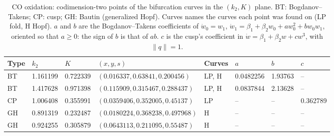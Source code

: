 \begin{table}
\centering
\caption{CO oxidation: codimension-two points of the bifurcation curves in the $(k_{2}, K)$ plane. BT: Bogdanov--Takens; CP: cusp; GH: Bautin (generalized Hopf). Curves names the curves each point was found on (LP fold, H Hopf). $a$ and $b$ are the Bogdanov--Takens coefficients of $\dot w_0 = w_1$, $\dot w_1 = \beta_1 + \beta_2 w_0 + a w_0^2 + b w_0 w_1$, oriented so that $a \ge 0$: the sign of $b$ is that of $ab$. $c$ is the cusp's coefficient in $\dot w = \beta_1 + \beta_2 w + c w^3$, with $\lVert q \rVert = 1$.}
\label{tab:co-oxidation-plane-points}
\begin{tabular}{@{}llllllll@{}}
\toprule
Type & $k_{2}$ & $K$ & $(x, y, s)$ & Curves & $a$ & $b$ & $c$ \\
\midrule
BT & \num{1.161199} & \num{0.722339} & $(\num{0.016337}, \num{0.63841}, \num{0.200456})$ & LP, H & \num{0.0482256} & \num{1.93763} & -- \\
BT & \num{1.417628} & \num{0.971398} & $(\num{0.115909}, \num{0.315467}, \num{0.288437})$ & LP, H & \num{0.0837844} & \num{2.13628} & -- \\
CP & \num{1.006408} & \num{0.355991} & $(\num{0.0359406}, \num{0.352005}, \num{0.45137})$ & LP & -- & -- & \num{0.362789} \\
GH & \num{0.891319} & \num{0.232487} & $(\num{0.0180224}, \num{0.368238}, \num{0.497968})$ & H & -- & -- & -- \\
GH & \num{0.924255} & \num{0.305879} & $(\num{0.0643113}, \num{0.211095}, \num{0.55487})$ & H & -- & -- & -- \\
\bottomrule
\end{tabular}
\end{table}
